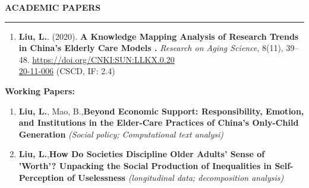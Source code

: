 \documentclass{resume} %
\renewenvironment{rSection}[1]{
\sectionskip
\textcolor{CarnegieMellonRed}{\MakeUppercase{#1}} %
\sectionlineskip
\hrule %
\begin{list}{}{
\setlength{\leftmargin}{1.5em} %
}
\item[]
}{
\end{list}
}
\begin{document}
\begin{rSection}{\bf Academic Papers}
\begin{enumerate}
\item \textbf{Liu, L.}. (2020). \textbf{A Knowledge Mapping Analysis of Research Trends in China’s Elderly Care Models
.} \textit{Research on Aging Science}, 8(11), 39–48. \href{https://doi.org/CNKI:SUN:LLKX.0.2020-11-006}{https://doi.org/CNKI:SUN:LLKX.0.20
\\20-11-006}
\textcolor{RoyalBlueCustom}{(CSCD, IF: 2.4)}
\end{enumerate}   
\newpage
\textbf{Working Papers:}
\begin{enumerate}   
\item\textbf{Liu, L.}, Mao, B.,\textbf{Beyond Economic Support: Responsibility, Emotion, and Institutions in the Elder-Care Practices of China’s Only-Child Generation} \textit{(Social policy; Computational text analysi)}
\item\textbf{Liu, L.},\textbf{How Do Societies Discipline Older Adults' Sense of 'Worth'?
Unpacking the Social Production of Inequalities in Self-Perception of Uselessness} \textit{(longitudinal data; decomposition analysis)}

\end{enumerate} 
\end{rSection}
\end{document}
